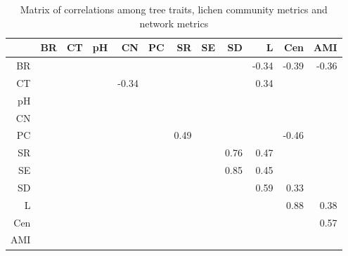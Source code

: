 \begin{table}[ht]
\centering
\begin{tabular}{rrrrrrrrrrrr}
  \hline
 & BR & CT & pH & CN & PC & SR & SE & SD & L & Cen & AMI \\ 
  \hline
BR &  &  &  &  &  &  &  &  & -0.34 & -0.39 & -0.36 \\ 
  CT &  &  &  & -0.34 &  &  &  &  & 0.34 &  &  \\ 
  pH &  &  &  &  &  &  &  &  &  &  &  \\ 
  CN &  &  &  &  &  &  &  &  &  &  &  \\ 
  PC &  &  &  &  &  & 0.49 &  &  &  & -0.46 &  \\ 
  SR &  &  &  &  &  &  &  & 0.76 & 0.47 &  &  \\ 
  SE &  &  &  &  &  &  &  & 0.85 & 0.45 &  &  \\ 
  SD &  &  &  &  &  &  &  &  & 0.59 & 0.33 &  \\ 
  L &  &  &  &  &  &  &  &  &  & 0.88 & 0.38 \\ 
  Cen &  &  &  &  &  &  &  &  &  &  & 0.57 \\ 
  AMI &  &  &  &  &  &  &  &  &  &  &  \\ 
   \hline
\end{tabular}
\caption{Matrix of correlations among tree traits, lichen community metrics and network metrics} 
\label{tab:cormat}
\end{table}
